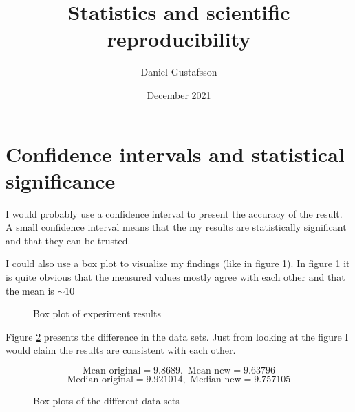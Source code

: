 \documentclass[11pt, a4paper]{article}
\title{Statistics and scientific reproducibility}
\author{Daniel Gustafsson}
\date{December 2021}
\begin{document}
\maketitle

\section{Confidence intervals and statistical significance}

I would probably use a confidence interval to present the accuracy 
of the result. A small confidence interval means that the my results
are statistically significant and that they can be trusted. 

I could also use a box plot to visualize my findings (like in figure \ref{fig:plot1}).
In figure \ref{fig:plot1} it is quite obvious that the measured values mostly agree
with each other and that the mean is $\sim 10$ 


\begin{figure}[h]
	\label{fig:plot1}
	\centering
	\caption{Box plot of experiment results}
	
\end{figure}

\vspace{4mm}\noindent
Figure \ref{fig:plot2} presents the difference in the data sets. Just from looking at the
figure I would claim the results are consistent with each other.

\[\text{Mean original} = 9.8689, \text{ Mean new} = 9.63796\]
\[\text{Median original} = 9.921014, \text{ Median new} = 9.757105\]


\begin{figure}[h]
	\label{fig:plot2}
	\centering
	\caption{Box plots of the different data sets}
	
\end{figure}
\end{document}
